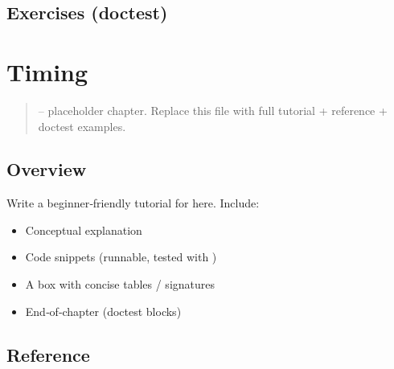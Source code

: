 \documentclass[a4paper,11pt,english]{sphinxmanual}
\begin{document}
\subsection{Exercises (doctest)}
\label{\detokenize{performance/profiling:exercises-doctest}}
\begin{sphinxVerbatim}[commandchars=\\\{\}]
\end{sphinxVerbatim}

\sphinxstepscope


\section{Timing}
\label{\detokenize{performance/timing:timing}}\label{\detokenize{performance/timing::doc}}\begin{quote}

\sphinxAtStartPar
{} – placeholder chapter. Replace this file with full tutorial + reference + doctest examples.
\end{quote}


\subsection{Overview}
\label{\detokenize{performance/timing:overview}}
\sphinxAtStartPar
Write a beginner‑friendly tutorial for  here. Include:
\begin{itemize}
\item {} 
\sphinxAtStartPar
Conceptual explanation

\item {} 
\sphinxAtStartPar
Code snippets (runnable, tested with )

\item {} 
\sphinxAtStartPar
A  box with concise tables / signatures

\item {} 
\sphinxAtStartPar
End‑of‑chapter  (doctest blocks)

\end{itemize}


\subsection{Reference}
\label{\detokenize{performance/timing:reference}}
\end{document}
